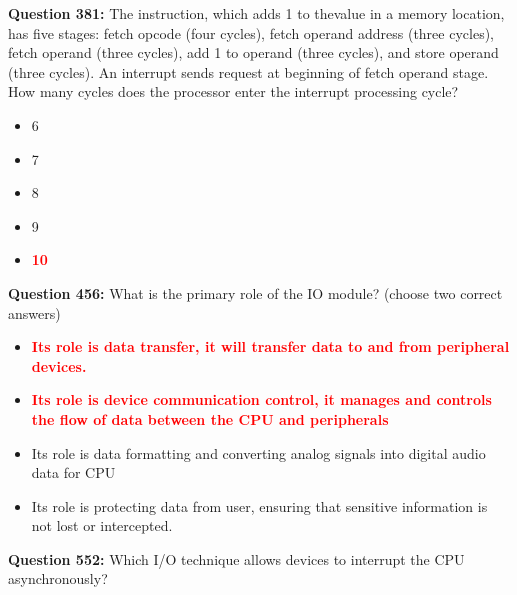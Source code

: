 \documentclass[12pt,a4paper]{article}
\begin{document}
\vspace{0.5cm}

\vspace{0.5cm}

\textbf{Question 381:} The instruction, which adds 1 to thevalue in a memory location, has five stages: fetch opcode (four cycles), fetch operand address (three cycles), fetch operand (three cycles), add 1 to operand (three cycles), and store operand (three cycles). An interrupt sends request at beginning of fetch operand stage. How many cycles does the processor enter the interrupt processing cycle?

\begin{itemize}
    \item[\textbf{A.}] 6
    \item[\textbf{B.}] 7
    \item[\textbf{C.}] 8
    \item[\textbf{D.}] 9
    \item[\textbf{E.}] \textcolor{red}{\textbf{10}}
\end{itemize}

\vspace{0.5cm}

\vspace{0.5cm}

\textbf{Question 456:} What is the primary role of the IO module? (choose two correct answers)

\begin{itemize}
    \item[\textbf{A.}] \textcolor{red}{\textbf{Its role is data transfer, it will transfer data to and from peripheral devices.}}
    \item[\textbf{B.}] \textcolor{red}{\textbf{Its role is device communication control, it manages and controls the flow of data between the CPU and peripherals}}
    \item[\textbf{C.}] Its role is data formatting and converting analog signals into digital audio data for CPU
    \item[\textbf{D.}] Its role is protecting data from user, ensuring that sensitive information is not lost or intercepted.
\end{itemize}

\vspace{0.5cm}

\vspace{0.5cm}



\textbf{Question 552:} Which I/O technique allows devices to interrupt the CPU asynchronously?
\end{document}
